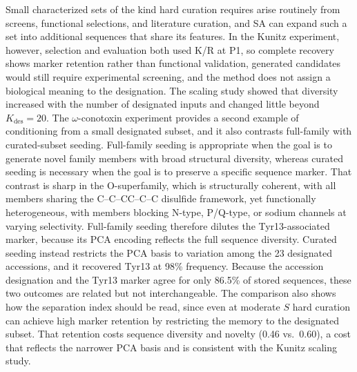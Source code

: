 Small characterized sets of the kind hard curation requires arise routinely from screens,
functional selections, and literature curation, and SA can expand such a set into additional
sequences that share its features. In the Kunitz experiment, however, selection and evaluation
both used K/R at P1, so complete recovery shows marker retention rather than functional
validation, generated candidates would still require experimental screening, and the method
does not assign a biological meaning to the designation. The scaling study showed that
diversity increased with the number of designated inputs and changed little beyond
$K_{\mathrm{des}}=20$. The $\omega$-conotoxin experiment provides a second example of
conditioning from a small designated subset, and it also contrasts full-family with
curated-subset seeding. Full-family seeding is appropriate when the goal is to generate novel
family members with broad structural diversity, whereas curated seeding is necessary when the
goal is to preserve a specific sequence marker. That contrast is sharp in the O-superfamily,
which is structurally coherent, with all members sharing the C--C--CC--C--C disulfide
framework, yet functionally heterogeneous, with members blocking N-type, P/Q-type, or sodium
channels at varying selectivity. Full-family seeding therefore dilutes the Tyr13-associated
marker, because its PCA encoding reflects the full sequence diversity. Curated seeding instead
restricts the PCA basis to variation among the 23 designated accessions, and it recovered
Tyr13 at 98\% frequency. Because the accession designation and the Tyr13 marker agree for only
86.5\% of stored sequences, these two outcomes are related but not interchangeable. The
comparison also shows how the separation index should be read, since even at moderate $S$ hard
curation can achieve high marker retention by restricting the memory to the designated subset.
That retention costs sequence diversity and novelty (0.46 vs.\ 0.60), a cost that reflects the
narrower PCA basis and is consistent with the Kunitz scaling study.

